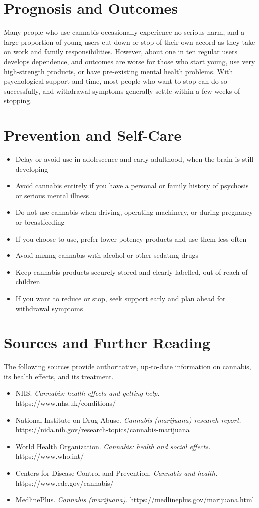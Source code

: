 \section*{Prognosis and Outcomes}
Many people who use cannabis occasionally experience no serious harm, and a large proportion of young users cut down or stop of their own accord as they take on work and family responsibilities. However, about one in ten regular users develops dependence, and outcomes are worse for those who start young, use very high-strength products, or have pre-existing mental health problems. With psychological support and time, most people who want to stop can do so successfully, and withdrawal symptoms generally settle within a few weeks of stopping.

\section*{Prevention and Self-Care}
\begin{itemize}
    \item Delay or avoid use in adolescence and early adulthood, when the brain is still developing
    \item Avoid cannabis entirely if you have a personal or family history of psychosis or serious mental illness
    \item Do not use cannabis when driving, operating machinery, or during pregnancy or breastfeeding
    \item If you choose to use, prefer lower-potency products and use them less often
    \item Avoid mixing cannabis with alcohol or other sedating drugs
    \item Keep cannabis products securely stored and clearly labelled, out of reach of children
    \item If you want to reduce or stop, seek support early and plan ahead for withdrawal symptoms
\end{itemize}

\section*{Sources and Further Reading}
The following sources provide authoritative, up-to-date information on cannabis, its health effects, and its treatment.
\begin{itemize}
    \item NHS. \textit{Cannabis: health effects and getting help.} https://www.nhs.uk/conditions/
    \item National Institute on Drug Abuse. \textit{Cannabis (marijuana) research report.} https://nida.nih.gov/research-topics/cannabis-marijuana
    \item World Health Organization. \textit{Cannabis: health and social effects.} https://www.who.int/
    \item Centers for Disease Control and Prevention. \textit{Cannabis and health.} https://www.cdc.gov/cannabis/
    \item MedlinePlus. \textit{Cannabis (marijuana).} https://medlineplus.gov/marijuana.html
\end{itemize}
